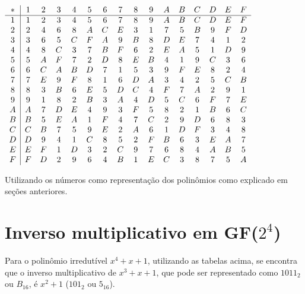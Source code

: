 \documentclass[12pt]{article}
\begin{document}
\begin{center}
    $\begin{array}{ c | c c c c c c c c c c c c c c c }
        * & 1 & 2 & 3 & 4 & 5 & 6 & 7 & 8 & 9 & A & B & C & D & E & F \\ \hline
        1 & 1 & 2 & 3 & 4 & 5 & 6 & 7 & 8 & 9 & A & B & C & D & E & F \\
        2 & 2 & 4 & 6 & 8 & A & C & E & 3 & 1 & 7 & 5 & B & 9 & F & D \\
        3 & 3 & 6 & 5 & C & F & A & 9 & B & 8 & D & E & 7 & 4 & 1 & 2 \\
        4 & 4 & 8 & C & 3 & 7 & B & F & 6 & 2 & E & A & 5 & 1 & D & 9 \\
        5 & 5 & A & F & 7 & 2 & D & 8 & E & B & 4 & 1 & 9 & C & 3 & 6 \\
        6 & 6 & C & A & B & D & 7 & 1 & 5 & 3 & 9 & F & E & 8 & 2 & 4 \\
        7 & 7 & E & 9 & F & 8 & 1 & 6 & D & A & 3 & 4 & 2 & 5 & C & B \\
        8 & 8 & 3 & B & 6 & E & 5 & D & C & 4 & F & 7 & A & 2 & 9 & 1 \\
        9 & 9 & 1 & 8 & 2 & B & 3 & A & 4 & D & 5 & C & 6 & F & 7 & E \\
        A & A & 7 & D & E & 4 & 9 & 3 & F & 5 & 8 & 2 & 1 & B & 6 & C \\
        B & B & 5 & E & A & 1 & F & 4 & 7 & C & 2 & 9 & D & 6 & 8 & 3 \\
        C & C & B & 7 & 5 & 9 & E & 2 & A & 6 & 1 & D & F & 3 & 4 & 8 \\
        D & D & 9 & 4 & 1 & C & 8 & 5 & 2 & F & B & 6 & 3 & E & A & 7 \\
        E & E & F & 1 & D & 3 & 2 & C & 9 & 7 & 6 & 8 & 4 & A & B & 5 \\
        F & F & D & 2 & 9 & 6 & 4 & B & 1 & E & C & 3 & 8 & 7 & 5 & A \\
	\end{array}$
\end{center}

Utilizando os números como representação dos polinômios como explicado em
seções anteriores.

\section{Inverso multiplicativo em GF($2^{4}$)}

Para o polinômio irredutível $x^{4}+x+1$, utilizando as tabelas acima, se
encontra que o inverso multiplicativo de $x^{3}+x+1$, que pode ser representado
como $1011_{2}$ ou $B_{16}$, é $x^{2}+1$ ($101_{2}$ ou $5_{16}$).



\end{document}
